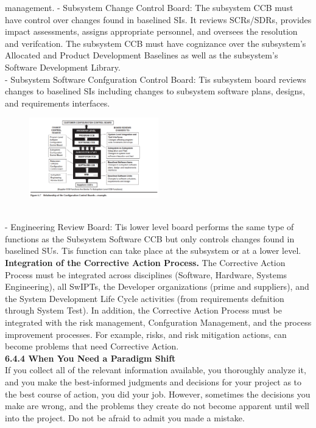 \documentclass[twocolumn,a4paper,13pt]{book}
\begin{document}
management.
- Subsystem Change Control Board: The subsystem CCB
must have control over changes found in baselined SIs.
It reviews SCRs/SDRs, provides impact assessments,
assigns appropriate personnel, and oversees the resolution and verifcation. The subsystem CCB must have
cognizance over the subsystem’s Allocated and Product
Development Baselines as well as the subsystem’s
Software Development Library.\\
- Subsystem Software Confguration Control Board:
Tis subsystem board reviews changes to baselined
SIs including changes to subsystem software plans,
designs, and requirements interfaces.
\begin{figure}[h!]
	\centering
	\includegraphics[width=0.5\textwidth]{ccb}
\end{figure}\\
- Engineering Review Board: Tis lower level board performs the same type of functions as the Subsystem
Software CCB but only controls changes found in
baselined SUs. Tis function can take place at the subsystem or at a lower level.\\
\textbf{Integration of the Corrective Action Process.} The
Corrective Action Process must be integrated across disciplines (Software, Hardware, Systems Engineering), all SwIPTs,
the Developer organizations (prime and suppliers), and the
System Development Life Cycle activities (from requirements defnition through System Test). In addition, the Corrective Action Process must be integrated with the risk management, Confguration Management, and the process improvement
processes. For example, risks, and risk mitigation actions, can become problems that need Corrective Action.\\
\textbf{6.4.4 When You Need a Paradigm Shift}\\ If you collect all of the relevant information available, you thoroughly analyze it, and you make the best-informed judgments and decisions for your project as to the best course of action, you did your job. However, sometimes the decisions you make are wrong, and the problems they create do not become apparent until well into the project. Do not be afraid to admit you made a mistake.
\end{document}
